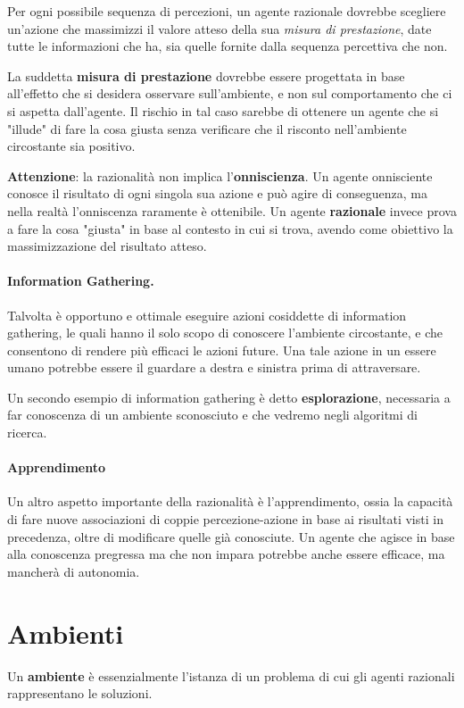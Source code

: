         Per ogni possibile sequenza di percezioni, un agente razionale dovrebbe scegliere un'azione che massimizzi il valore atteso della sua \textit{misura di prestazione}, date tutte le informazioni che ha, sia quelle fornite dalla sequenza percettiva che non.
        
        La suddetta \textbf{misura di prestazione} dovrebbe essere progettata in base all'effetto che si desidera osservare sull'ambiente, e non sul comportamento che ci si aspetta dall'agente. Il rischio in tal caso sarebbe di ottenere un agente che si "illude" di fare la cosa giusta senza verificare che il risconto nell'ambiente circostante sia positivo.
        
        \textbf{Attenzione}: la razionalità non implica l'\textbf{onniscienza}. Un agente onnisciente conosce il risultato di ogni singola sua azione e può agire di conseguenza, ma nella realtà l'onniscenza raramente è ottenibile. Un agente \textbf{razionale} invece prova a fare la cosa "giusta" in base al contesto in cui si trova, avendo come obiettivo la massimizzazione del risultato atteso.
        
        \paragraph{Information Gathering.} Talvolta è opportuno e ottimale eseguire azioni cosiddette di information gathering, le quali hanno il solo scopo di conoscere l'ambiente circostante, e che consentono di rendere più efficaci le azioni future. Una tale azione in un essere umano potrebbe essere il guardare a destra e sinistra prima di attraversare.
        
        Un secondo esempio di information gathering è detto \textbf{esplorazione}, necessaria a far conoscenza di un ambiente sconosciuto e che vedremo negli algoritmi di ricerca.
        
        \paragraph{Apprendimento} Un altro aspetto importante della razionalità è l'apprendimento, ossia la capacità di fare nuove associazioni di coppie percezione-azione in base ai risultati visti in precedenza, oltre di modificare quelle già conosciute. Un agente che agisce in base alla conoscenza pregressa ma che non impara potrebbe anche essere efficace, ma mancherà di autonomia.
        
\section{Ambienti}
    Un \textbf{ambiente} è essenzialmente l'istanza di un problema di cui gli agenti razionali rappresentano le soluzioni.
    
